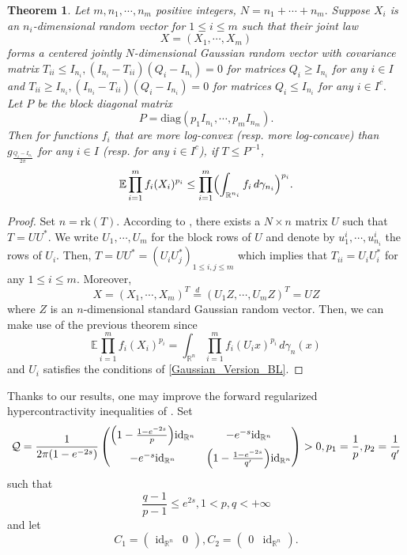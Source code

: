\documentclass[11pt,a4paper,reqno]{amsart}
\numberwithin{equation}{section}
\newtheorem{theorem}{Theorem}[section]
\theoremstyle{definition}
\newcommand{\nm}{\noalign{\smallskip}}
\newcommand{\<}{\ensuremath \leq}
\renewcommand{\>}{\ensuremath \geq}
\begin{document}
\begin{theorem}
    Let $m,n_1,\cdots,n_m$ positive integers, $N=n_1+\cdots+n_m.$ Suppose $X_i$ is an $n_i$-dimensional random vector for $1 \leq i \leq m$ such that their joint law $$X=(X_1,\cdots,X_m)$$ forms a centered jointly $N$-dimensional Gaussian random vector with covariance matrix $T_{ii} \leq I_{n_i}, (I_{n_i}-T_{ii})(Q_i-I_{n_i})=0$ for matrices $Q_i \geq I_{n_i}$ for any $i \in I$ and $T_{ii} \geq I_{n_i}, (I_{n_i}-T_{ii})(Q_i-I_{n_i})=0$ for matrices $Q_i \leq I_{n_i}$ for any $i \in I^c.$ Let $P$ be the block diagonal matrix $$P=\mathrm{diag}(p_1I_{n_1},\cdots,p_mI_{n_m}).$$ Then for functions $f_i$ that are more log-convex (resp. more log-concave) than $g_{\frac{Q_i-I_{n_i}}{2\pi}}$ for any $i \in I$ (resp. for any $i \in I^c$), if $T \leq P^{-1}$, $$\mathbb{E}\prod_{i=1}^m f_i(X_i)^{p_i} \leq \prod_{i=1}^m \Bigl(\int_{\mathbb{R}^{n_i}} f_i \, d\gamma_{n_i} \Bigl)^{p_i}.$$ 
\end{theorem}

\begin{proof}
    Set $n=\mathrm{rk}(T).$ According to \cite[Lemma 2]{Chen_Dafnis_Paouris}, there exists a $N \times n$ matrix $U$ such that $T=UU^*.$ We write $U_1,\cdots,U_m$ for the block rows of $U$ and denote by $u_1^i,\cdots,u_{n_i}^i$ the rows of $U_i.$ Then, $T=UU^*=(U_iU_j^*)_{1 \leq i,j \leq m}$ which implies that $T_{ii}=U_iU_i^*$ for any $1 \leq i \leq m.$ Moreover, $$X=(X_1,\cdots,X_m)^T\overset{d}{=}(U_1Z,\cdots,U_mZ)^T=UZ$$ where $Z$ is an $n$-dimensional standard Gaussian random vector. Then, we can make use of the previous theorem since $$\mathbb{E}\prod_{i=1}^m f_i(X_i)^{p_i}=\int_{\mathbb{R}^n}\prod_{i=1}^m f_i(U_ix)^{p_i}\, d\gamma_n(x)$$ and $U_i$ satisfies the conditions of \cref{Gaussian_Version_BL}. 
\end{proof}


Thanks to our results, one may improve the forward regularized hypercontractivity inequalities of \cite[Corollary 6.6]{Nakamura_Tsuji}. Set $$\mathcal{Q}=\frac{1}{2\pi(1-e^{-2s})}\begin{pmatrix}
    \Bigl( 1-\frac{1-e^{-2s}}{p}\Bigl) \mathrm{id}_{\mathbb{R}^n} & -e^{-s}\mathrm{id}_{\mathbb{R}^n} \\
    \nm 
    -e^{-s}\mathrm{id}_{\mathbb{R}^n} & \Bigl( 1-\frac{1-e^{-2s}}{q'}\Bigl)\mathrm{id}_{\mathbb{R}^n}
\end{pmatrix}>0, p_1=\frac{1}{p}, p_2=\frac{1}{q'}$$ such that $$\frac{q-1}{p-1} \le e^{2s}, 1<p,q<+\infty$$ and let $$C_1=\begin{pmatrix}\mathrm{id}_{\mathbb{R}^n} & 0\end{pmatrix}, C_2=\begin{pmatrix} 0 & \mathrm{id}_{\mathbb{R}^n}\end{pmatrix}.$$  
\end{document}
